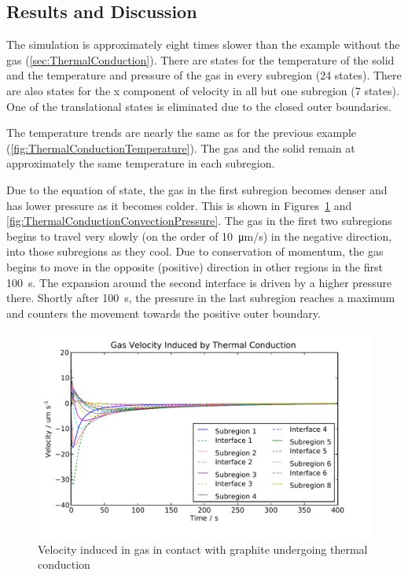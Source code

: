 \subsection{Results and Discussion}



The simulation is approximately eight times slower than the example without the gas (\autoref{sec:ThermalConduction}).  There are states for the temperature of the solid and the temperature and pressure of the gas in every subregion (24 states).  There are also states for the x component of velocity in all but one subregion (7 states).  One of the translational states is eliminated due to the closed outer boundaries.

The temperature trends are nearly the same as for the previous example (\autoref{fig:ThermalConductionTemperature}).  The gas and the solid remain at approximately the same temperature in each subregion.  

Due to the equation of state, the gas in the first subregion becomes denser and has lower pressure as it becomes colder.  This is shown in Figures~\ref{fig:ThermalConductionConvectionVelocity} and \ref{fig:ThermalConductionConvectionPressure}.  The gas in the first two subregions begins to travel very slowly (on the order of \SI{10}{\micro\m/\s}) in the negative direction, into those subregions as they cool.  Due to conservation of momentum, the gas begins to move in the opposite (positive) direction in other regions in the first \SI{100}{s}.  The expansion around the second interface is driven by a higher pressure there.  Shortly after \SI{100}{s}, the pressure in the last subregion reaches a maximum and counters the movement towards the positive outer boundary.

\begin{figure}[htbp]
  \includegraphics[width=\linewidth]{Results/Basic/ThermalConductionConvection/Velocity}%
  \caption{Velocity induced in gas in contact with graphite undergoing thermal conduction}%
  \label{fig:ThermalConductionConvectionVelocity}
\end{figure}

